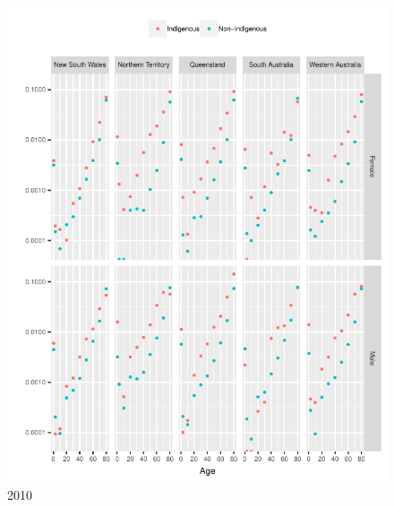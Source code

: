 \documentclass{article}
\begin{document}
\begin{figure}
  \centering
  \includegraphics{out/fig_rates_direct_2010}
  \caption{2010}
\end{figure}
\newpage
\end{document}
